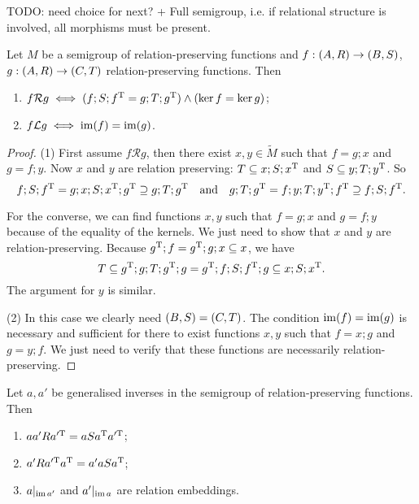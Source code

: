 TODO: need choice for next? + Full semigroup, i.e. if relational structure is involved, all morphisms must be present.
\begin{proposition}
Let $M$ be a semigroup of relation-preserving functions and $f: \left( A, R \right) \to \left( B,S \right)$, $g: \left( A, R \right) \to \left( C,T \right)$ relation-preserving functions. Then
\begin{enumerate}
\item $f\mathcal{R}g \iff (f;S;f^{\mathrm{T}} = g;T;g^{\mathrm{T}})\land (\ker f = \ker g)$;
\item $f\mathcal{L} g \iff \operatorname{im}(f) = \operatorname{im}(g)$.
\end{enumerate}
\end{proposition}
\begin{proof}
(1) First assume $f\mathcal{R}g$, then there exist $x,y\in \tilde{M}$ such that $f = g;x$ and $g = f;y$. Now $x$ and $y$ are relation preserving: $T \subseteq x;S;x^{\mathrm{T}}$ and $S \subseteq y;T;y^{\mathrm{T}}$. So
\[ f;S;f^{\mathrm{T}} = g;x;S;x^{\mathrm{T}};g^{\mathrm{T}} \supseteq g;T;g^{\mathrm{T}} \quad\text{and}\quad g;T;g^{\mathrm{T}} = f;y;T;y^{\mathrm{T}};f^{\mathrm{T}}  \supseteq f;S;f^{\mathrm{T}}. \]

For the converse, we can find functions $x,y$ such that $f = g;x$ and $g = f;y$ because of the equality of the kernels. We just need to show that $x$ and $y$ are relation-preserving. Because $g^{\mathrm{T}};f = g^{\mathrm{T}};g;x \subseteq x$, we have
\[ T \subseteq g^{\mathrm{T}};g;T;g^{\mathrm{T}};g = g^{\mathrm{T}};f;S;f^{\mathrm{T}};g \subseteq x;S;x^{\mathrm{T}}. \]
The argument for $y$ is similar.

(2) In this case we clearly need $\left( B,S \right) = \left( C,T \right)$. The condition $\operatorname{im}(f) = \operatorname{im}(g)$ is necessary and sufficient for there to exist functions $x,y$ such that $f = x;g$ and $g = y;f$. We just need to verify that these functions are necessarily relation-preserving. 
\end{proof}
\begin{corollary} \label{relationPreservingGeneralisedInversesEmbeddings}
Let $a,a'$ be generalised inverses in the semigroup of relation-preserving functions. Then
\begin{enumerate}
\item $aa'R a^{\prime\mathrm{T}} = aSa^{\mathrm{T}} a^{\prime\mathrm{T}}$;
\item $a'R a^{\prime\mathrm{T}}a^{\mathrm{T}} = a'aSa^{\mathrm{T}}$;
\item $a|_{\operatorname{im} a'}$ and $a'|_{\operatorname{im} a}$ are relation embeddings.
\end{enumerate}
\end{corollary}
